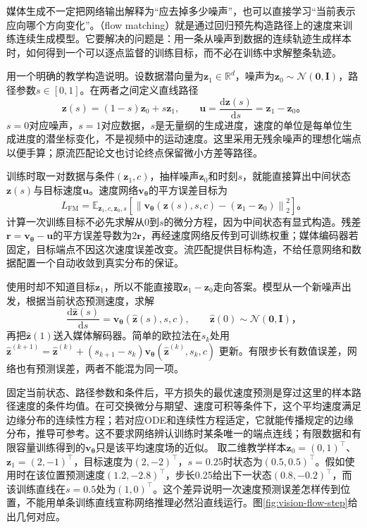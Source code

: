 媒体生成不一定把网络输出解释为“应去掉多少噪声”，也可以直接学习“当前表示应向哪个方向变化”。（flow matching）就是通过回归预先构造路径上的速度来训练连续生成模型。它要解决的问题是：用一条从噪声到数据的连续轨迹生成样本时，如何得到一个可以逐点监督的训练目标，而不必在训练中求解整条轨迹。

用一个明确的教学构造说明。设数据潜向量为$\bm z_1\in\mathbb R^d$，噪声为$\bm z_0\sim\mathcal N(\bm0,\bm I)$，路径参数$s\in[0,1]$。在两者之间定义直线路径
\begin{equation}
  \bm z(s)=(1-s)\bm z_0+s\bm z_1,
  \qquad
  \bm u=\frac{\mathrm d\bm z(s)}{\mathrm ds}
       =\bm z_1-\bm z_0\text{。}
  \label{eq:vision-flow-path}
\end{equation}
$s=0$对应噪声，$s=1$对应数据，$s$是无量纲的生成进度，速度的单位是每单位生成进度的潜坐标变化，不是视频中的运动速度。这里采用无残余噪声的理想化端点以便手算；原流匹配论文也讨论终点保留微小方差等路径。

训练时取一对数据与条件$(\bm z_1,c)$，抽样噪声$\bm z_0$和时刻$s$，就能直接算出中间状态$\bm z(s)$与目标速度$\bm u$。速度网络$\bm v_{\bm\theta}$的平方误差目标为
\begin{equation}
  L_{\mathrm{FM}}
  =\mathbb E_{\bm z_1,c,\bm z_0,s}
     \left[
       \left\lVert
         \bm v_{\bm\theta}(\bm z(s),s,c)
           -(\bm z_1-\bm z_0)
       \right\rVert_2^2
     \right]\text{。}
  \label{eq:vision-flow-loss}
\end{equation}
计算一次训练目标不必先求解从0到$s$的微分方程，因为中间状态有显式构造。残差$\bm r=\bm v_{\bm\theta}-\bm u$的平方误差导数为$2\bm r$，再经速度网络反传到可训练权重；媒体编码器若固定，目标端点不因这次速度误差改变。流匹配提供目标构造，不给任意网络和数据配置一个自动收敛到真实分布的保证。

使用时却不知道目标$\bm z_1$，所以不能直接取$\bm z_1-\bm z_0$走向答案。模型从一个新噪声出发，根据当前状态预测速度，求解
\begin{equation}
  \frac{\mathrm d\widehat{\bm z}(s)}{\mathrm ds}
    =\bm v_{\bm\theta}(\widehat{\bm z}(s),s,c),
  \qquad
  \widehat{\bm z}(0)\sim\mathcal N(\bm0,\bm I)\text{，}
  \label{eq:vision-flow-ode}
\end{equation}
再把$\widehat{\bm z}(1)$送入媒体解码器。简单的欧拉法在$s_k$处用
$\widehat{\bm z}^{(k+1)}
=\widehat{\bm z}^{(k)}+(s_{k+1}-s_k)
\bm v_{\bm\theta}(\widehat{\bm z}^{(k)},s_k,c)$
更新。有限步长有数值误差，网络也有预测误差，两者不能混为同一项。

固定当前状态、路径参数和条件后，平方损失的最优速度预测是穿过这里的样本路径速度的条件均值。在可交换微分与期望、速度可积等条件下，这个平均速度满足边缘分布的连续性方程；若对应ODE和连续性方程适定，它就能传播规定的边缘分布，推导可参考。这不要求网络辨认训练时某条唯一的端点连线；有限数据和有限容量训练得到的$\bm v_{\bm\theta}$只是该平均速度场的近似。
取二维教学样本$\bm z_0=(0,1)^\top$、$\bm z_1=(2,-1)^\top$，目标速度为$(2,-2)^\top$，$s=0.25$时状态为$(0.5,0.5)^\top$。假如使用时在该位置预测速度$(1.2,-2.8)^\top$，步长0.25给出下一状态$(0.8,-0.2)^\top$，而该训练直线在$s=0.5$处为$(1,0)^\top$。这个差异说明一次速度预测误差怎样传到位置，不能用单条训练直线宣称网络推理必然沿直线运行。图\ref{fig:vision-flow-step}给出几何对应。

